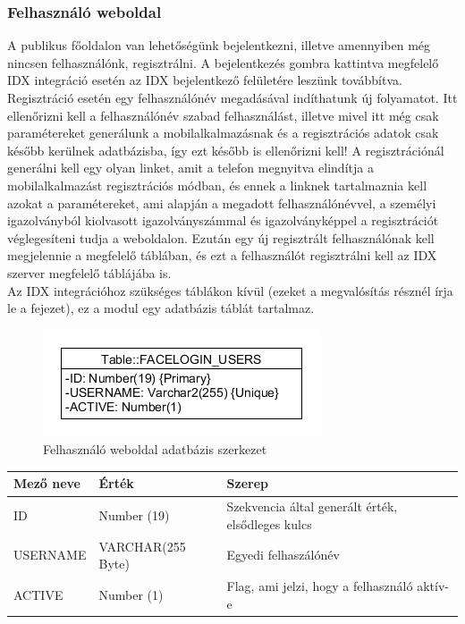 \subsubsection{Felhasználó weboldal}
A publikus főoldalon van lehetőségünk bejelentkezni, illetve amennyiben még nincsen felhasználónk, regisztrálni. A bejelentkezés gombra kattintva megfelelő IDX integráció esetén az IDX bejelentkező felületére leszünk továbbítva. Regisztráció esetén egy felhasználónév megadásával indíthatunk új folyamatot. Itt ellenőrizni kell a felhasználónév szabad felhasználást, illetve mivel itt még csak paramétereket generálunk a mobilalkalmazásnak és a regisztrációs adatok csak később kerülnek adatbázisba, így ezt később is ellenőrizni kell! A regisztrációnál generálni kell egy olyan linket, amit a telefon megnyitva elindítja a mobilalkalmazást regisztrációs módban, és ennek a linknek tartalmaznia kell azokat a paramétereket, ami alapján a megadott felhasználónévvel, a személyi igazolványból kiolvasott igazolványszámmal és igazolványképpel a regisztrációt véglegesíteni tudja a weboldalon.
Ezután egy új regisztrált felhasználónak kell megjelennie a megfelelő táblában, és ezt a felhasználót regisztrálni kell az IDX szerver megfelelő táblájába is.
\\Az IDX integrációhoz szükséges táblákon kívül (ezeket a megvalósítás résznél írja le a fejezet), ez a modul egy adatbázis táblát tartalmaz.

\begin{figure}[h]
 \begin{minipage}{1\textwidth} 
\centering
    \includegraphics[scale=0.7]{img/facelogin_db}
    \caption{Felhasználó weboldal adatbázis szerkezet}
 \end{minipage}
\end{figure}


	\begin{tabular}{|p{4cm}|p{3cm} |p{4cm}|}
   	\hline
	\textbf{Mező neve} & \textbf{Érték} & \textbf{Szerep}\\ \hline
	ID & Number (19) & Szekvencia által generált érték, elsődleges kulcs \\ \hline
	USERNAME & VARCHAR(255 Byte) & Egyedi felhaszálónév  \\ \hline
	ACTIVE & Number (1) & Flag, ami jelzi, hogy a felhasználó aktív-e \\ \hline
	\end{tabular}

